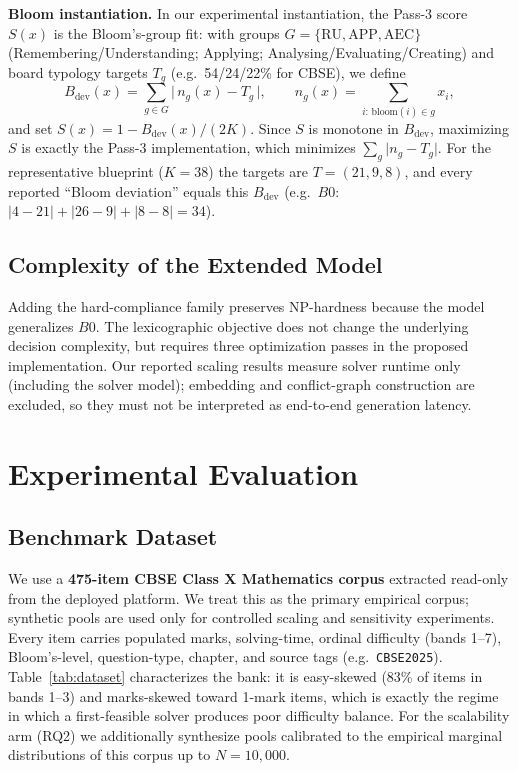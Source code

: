 \documentclass[runningheads]{llncs}
\begin{document}
\medskip\noindent\textbf{Bloom instantiation.} In our experimental instantiation, the Pass-3 score $S(x)$ is the Bloom's-group fit: with groups $G=\{\text{RU},\text{APP},\text{AEC}\}$ (Remembering/Understanding; Applying; Analysing/Evaluating/Creating) and board typology targets $T_g$ (e.g.\ 54/24/22\% for CBSE), we define
\begin{equation}
B_{\mathrm{dev}}(x)=\sum_{g\in G}\bigl|\,n_g(x)-T_g\,\bigr|,\qquad n_g(x)=\sum_{i:\,\mathrm{bloom}(i)\in g}x_i,
\end{equation}
and set $S(x)=1-B_{\mathrm{dev}}(x)/(2K)$.
Since $S$ is monotone in $B_{\mathrm{dev}}$, maximizing $S$ is exactly the Pass-3 implementation, which minimizes $\sum_g\lvert n_g-T_g\rvert$.
For the representative blueprint ($K{=}38$) the targets are $T=(21,9,8)$, and every reported ``Bloom deviation'' equals this $B_{\mathrm{dev}}$ (e.g.\ $B0$: $\lvert4{-}21\rvert{+}\lvert26{-}9\rvert{+}\lvert8{-}8\rvert=34$).

\subsection{Complexity of the Extended Model}
Adding the hard-compliance family preserves NP-hardness because the model generalizes $B0$.
The lexicographic objective does not change the underlying decision complexity, but requires three optimization passes in the proposed implementation.
Our reported scaling results measure solver runtime only (including the solver model);
embedding and conflict-graph construction are excluded, so they must not be interpreted as end-to-end generation latency.

\section{Experimental Evaluation}
\label{sec:experiments}

\subsection{Benchmark Dataset}
\label{sec:dataset}
We use a \textbf{475-item CBSE Class X Mathematics corpus} extracted read-only from the deployed platform.
We treat this as the primary empirical corpus; synthetic pools are used only for controlled scaling and sensitivity experiments.
Every item carries populated marks, solving-time, ordinal difficulty (bands 1--7), Bloom's-level, question-type, chapter, and source tags (e.g.\ \texttt{CBSE2025}).
Table~\ref{tab:dataset} characterizes the bank: it is easy-skewed (83\% of items in bands 1--3) and marks-skewed toward 1-mark items, which is exactly the regime in which a first-feasible solver produces poor difficulty balance.
For the scalability arm (RQ2) we additionally synthesize pools calibrated to the empirical marginal distributions of this corpus up to $N=10{,}000$.
\end{document}
